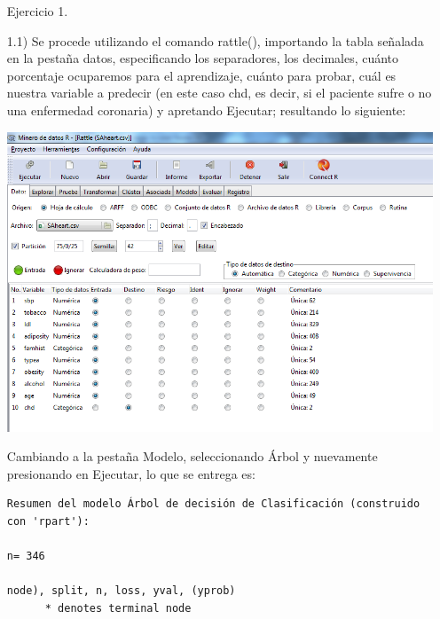 \documentclass[11pt,a4paper]{report}
\begin{document}


\newpage



\hfill \newline
\begin{itemize}
\item[ Ejercicio 1.]
\item[1.1)] Se procede utilizando el comando rattle(), importando la tabla señalada en la pestaña datos, especificando los separadores, los decimales, cuánto porcentaje ocuparemos para el aprendizaje, cuánto para probar, cuál es nuestra variable a predecir (en este caso chd, es decir, si el paciente sufre o no una enfermedad coronaria) y apretando Ejecutar; resultando lo siguiente:
\begin{center}
\includegraphics[scale=0.6]{3-1.png}
\end{center}
Cambiando a la pestaña Modelo, seleccionando Árbol y nuevamente presionando en Ejecutar, lo que se entrega es: 
\begin{verbatim}
Resumen del modelo Árbol de decisión de Clasificación (construido con 'rpart'):

n= 346 

node), split, n, loss, yval, (yprob)
      * denotes terminal node


\end{verbatim}
\end{itemize}
\end{document}
